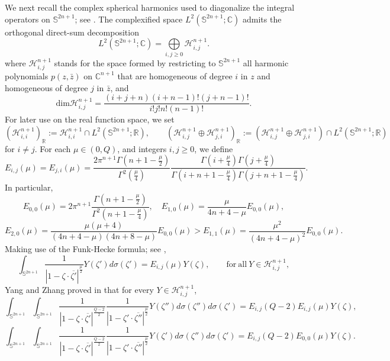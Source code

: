 \documentclass[11pt]{article}
\begin{document}
{We next recall the complex spherical harmonics used to diagonalize the integral operators on}
$\mathbb{S}^{2n+1}$; see \cite[Section 5.2]{FL12}. {The complexified space $L^2(\mathbb{S}^{2n+1};\mathbb C)$
 admits the orthogonal direct-sum decomposition}
\begin{equation*}
 {L^2(\mathbb{S}^{2n+1};\mathbb C)=\bigoplus\limits_{i,j\geq0}\mathcal{H}_{i,j}^{n+1}.}
\end{equation*}
where $\mathcal{H}_{i,j}^{n+1}$ stands for the space formed by restricting to $\mathbb{S}^{2n+1}$ all harmonic polynomials $p(z,\bar{z})$ on $\mathbb{C}^{n+1}$ that are
homogeneous of degree $i$ in $z$ and homogeneous of degree $j$ in $\bar{z}$, and
\begin{equation*}
 \mathrm{dim} \mathcal{H}_{i,j}^{n+1}=\frac{(i+j+n)(i+n-1)!(j+n-1)!}{i!j!n!(n-1)!}.
\end{equation*}
For later use on the real function space, we set
\[
 (\mathcal H_{i,i}^{n+1})_{\mathbb R}
 :=\mathcal H_{i,i}^{n+1}\cap L^2(\mathbb S^{2n+1};\mathbb R),
 \qquad
 (\mathcal H_{i,j}^{n+1}\oplus\mathcal H_{j,i}^{n+1})_{\mathbb R}
 :=(\mathcal H_{i,j}^{n+1}\oplus\mathcal H_{j,i}^{n+1})
 \cap L^2(\mathbb S^{2n+1};\mathbb R)
\]
for $i\ne j$.
For each $\mu\in (0,Q)$, and integers $i,j\geq0$, we define
\begin{equation*}
 E_{i,j}(\mu)=E_{j,i}(\mu)=\frac{2\pi^{n+1}\Gamma(n+1-\frac{\mu}{2})}{\Gamma^2(\frac{\mu}{4})}
 \frac{\Gamma(i+\frac{\mu}{4})\Gamma(j+\frac{\mu}{4})}{\Gamma(i+n+1-\frac{\mu}{4})\Gamma(j+n+1-\frac{\mu}{4})}.
\end{equation*}
In particular,
\begin{equation*}
 E_{0,0}(\mu)=2\pi^{n+1}\frac{\Gamma(n+1-\frac{\mu}{2})}{\Gamma^2(n+1-\frac{\mu}{4})},\quad E_{1,0}(\mu)=\frac{\mu}{4n+4-\mu}E_{0,0}(\mu),
\end{equation*}
\begin{equation*}
 E_{2,0}(\mu)=\frac{\mu(\mu+4)}{(4n+4-\mu)(4n+8-\mu)}E_{0,0}(\mu)>
 E_{1,1}(\mu)=\frac{\mu^2}{(4n+4-\mu)^2}E_{0,0}(\mu).
\end{equation*}
Making use of the Funk-Hecke formula; see \cite[Corollary 5.3]{FL12},
\begin{equation*}
 \int_{\mathbb{S}^{2n+1}}\frac{1}{|1-\zeta\cdot \overline{\zeta'}|^{\frac{\mu}{2}}}Y(\zeta')d \sigma(\zeta')=E_{i,j}(\mu) Y(\zeta),\qquad \mathrm{for~all}~Y \in \mathcal{H}_{i,j}^{n+1},
\end{equation*}
Yang and Zhang proved in \cite[Lemma 2.3]{YZ251} that for every $Y \in \mathcal{H}_{i,j}^{n+1}$,
\begin{equation}\label{FHA}
 \int_{\mathbb{S}^{2n+1}}\int_{\mathbb{S}^{2n+1}}\frac{1}{|1-\zeta\cdot \overline{\zeta'}|^{\frac{Q-2}{2}}}\frac{1}{|1-\zeta'\cdot \overline{\zeta''}|^{\frac{\mu}{2}}}Y(\zeta'')d \sigma( \zeta'')d \sigma(\zeta')=E_{i,j}(Q-2)E_{i,j}(\mu) Y(\zeta),
\end{equation}
\begin{equation*}
 \int_{\mathbb{S}^{2n+1}}\int_{\mathbb{S}^{2n+1}}\frac{1}{|1-\zeta\cdot \overline{\zeta'}|^{\frac{Q-2}{2}}}\frac{1}{|1-\zeta'\cdot \overline{\zeta''}|^{\frac{\mu}{2}}}Y(\zeta')d \sigma(\zeta'')d \sigma(\zeta')=E_{i,j}(Q-2)E_{0,0}(\mu) Y(\zeta).
\end{equation*}
\end{document}
